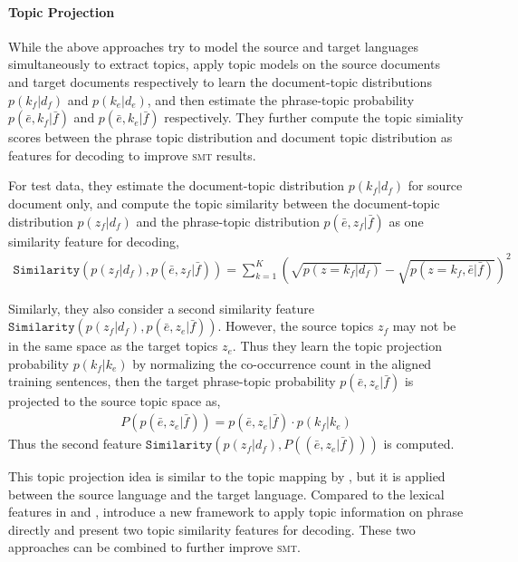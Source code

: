 \paragraph{\bf Topic Projection}

While the above approaches try to model the source and target
languages simultaneously to extract topics, \citet{xiao-12} apply
topic models on the source documents and target documents respectively
to learn the document-topic distributions $p(k_f | d_f)$ and $p(k_e |
d_e)$, and then estimate the phrase-topic probability $p(\bar{e}, k_f
| \bar{f})$ and $p(\bar{e}, k_e | \bar{f})$ respectively. They further
compute the topic simiality scores between the phrase topic
distribution and document topic distribution as features for decoding
to improve \textsc{smt} results.

For test data, they estimate the document-topic distribution $p(k_f |
d_f)$ for source document only, and compute the topic similarity
between the document-topic distribution $p(z_f|d_f)$ and the
phrase-topic distribution $p(\bar{e}, z_f|\bar{f})$ as one similarity
feature for decoding,
\begin{align}
\texttt{Similarity}(p(z_f|d_f), p(\bar{e}, z_f|\bar{f})) = \sum_{k=1}^{K} (\sqrt{p(z=k_f|d_f)} - \sqrt{p(z=k_f, \bar{e}|\bar{f})})^2
\end{align}

Similarly, they also consider a second similarity feature
$\texttt{Similarity}(p(z_f|d_f), p(\bar{e}, z_e|\bar{f}))$. However,
the source topics $z_f$ may not be in the same space as the target
topics $z_e$. Thus they learn the topic projection probability $p(k_f
| k_e)$ by normalizing the co-occurrence count in the aligned training
sentences, then the target phrase-topic probability $p(\bar{e},
z_e|\bar{f})$ is projected to the source topic space as,
\begin{align}
P(p(\bar{e}, z_e|\bar{f})) = p(\bar{e}, z_e|\bar{f}) \cdot p(k_f | k_e)
\end{align}
Thus the second feature $\texttt{Similarity}(p(z_f|d_f), P((\bar{e},
z_e|\bar{f})))$ is computed.

This topic projection idea is similar to the topic mapping by
\citet{su-12}, but it is applied between the source language and the
target language. Compared to the lexical features in
\citet{Eidelman-12} and \citet{hu-14}, \citet{xiao-12} introduce a new
framework to apply topic information on phrase directly and present
two topic similarity features for decoding. These two approaches can
be combined to further improve \textsc{smt}.


